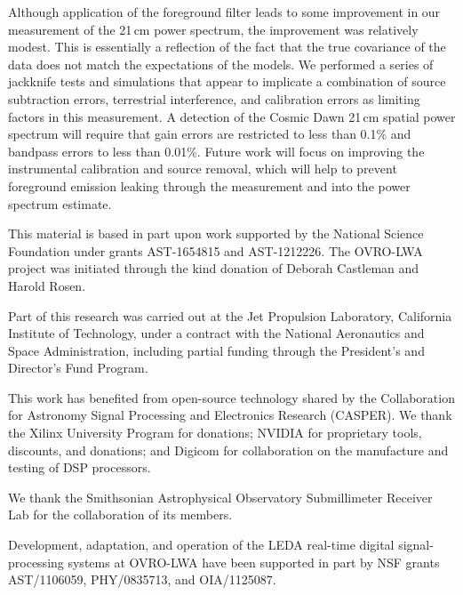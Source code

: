 \begin{bibunit}
Although application of the foreground filter leads to some improvement in our measurement of the
21\,cm power spectrum, the improvement was relatively modest. This is essentially a reflection of
the fact that the true covariance of the data does not match the expectations of the models. We
performed a series of jackknife tests and simulations that appear to implicate a combination of
source subtraction errors, terrestrial interference, and calibration errors as limiting factors in
this measurement. A detection of the Cosmic Dawn 21\,cm spatial power spectrum will require that
gain errors are restricted to less than 0.1\% and bandpass errors to less than 0.01\%.  Future work
will focus on improving the instrumental calibration and source removal, which will help to prevent
foreground emission leaking through the measurement and into the power spectrum estimate.

\acknowledgments

This material is based in part upon work supported by the National Science Foundation under grants
AST-1654815 and AST-1212226. The OVRO-LWA project was initiated through the kind donation of Deborah
Castleman and Harold Rosen.

Part of this research was carried out at the Jet Propulsion Laboratory, California Institute of
Technology, under a contract with the National Aeronautics and Space Administration, including
partial funding through the President's and Director's Fund Program.

This work has benefited from open-source technology shared by the Collaboration for Astronomy Signal
Processing and Electronics Research (CASPER).  We thank the Xilinx University Program for donations;
NVIDIA for proprietary tools, discounts, and donations; and Digicom for collaboration on the
manufacture and testing of DSP processors.

We thank the Smithsonian Astrophysical Observatory Submillimeter Receiver Lab for the collaboration
of its members.

Development, adaptation, and operation of the LEDA real-time digital signal-processing systems at
OVRO-LWA have been supported in part by NSF grants AST/1106059, PHY/0835713, and OIA/1125087.

\appendix


\end{bibunit}
